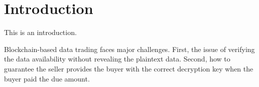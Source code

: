\section{Introduction}
\label{sec:introduction}

This is an introduction.



Blockchain-based data trading faces major challenges.
First, the issue of verifying the data availability without revealing the plaintext data.
Second, how to guarantee the seller provides the buyer with the correct decryption key when the buyer paid the due amount.


